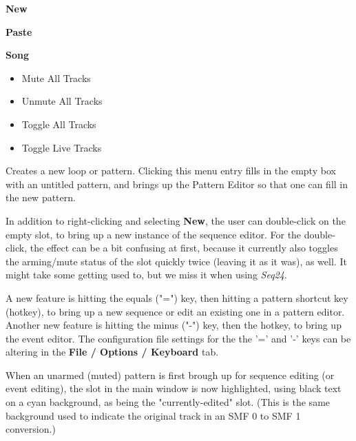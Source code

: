    \begin{enumber}
      \item \textbf{New}
      \item \textbf{Paste}
      \item \textbf{Song}
      \begin{itemize}
         \item {Mute All Tracks}
         \item {Unmute All Tracks}
         \item {Toggle All Tracks}
         \item {Toggle Live Tracks}
      \end{itemize}
   \end{enumber}

   \setcounter{ItemCounter}{0}      %

   Creates a new loop or pattern.
   Clicking this menu entry fills in the empty box with an untitled
   pattern, and brings up the Pattern Editor
   so that one can fill in the new pattern.

   In addition to right-clicking and selecting \textbf{New}, the user can
   double-click on the empty slot, to bring up a new instance of the sequence
   editor.  For the double-click, the effect can be a bit confusing at first,
   because it currently also toggles the arming/mute status of the slot
   quickly twice (leaving it as it was), as well.  It might take some getting
   used to, but we miss it when using \textsl{Seq24}.

   A new feature is hitting the equals ("=") key, then hitting
   a pattern shortcut key (hotkey), to bring up a new sequence or edit an
   existing one in a pattern editor.  Another new feature is hitting the minus
   ("-") key, then the hotkey, to bring up the event editor.  The
   configuration file settings for the the '=' and
   '-' keys can be altering in the \textbf{File / Options / Keyboard} tab.

   When an unarmed (muted) pattern is first brough up for sequence editing (or
   event editing), the slot in the main window is now highlighted, using black
   text on a cyan background, as being the "currently-edited" slot.
   (This is the same background used to indicate the original track in an
   SMF 0 to SMF 1 conversion.)

